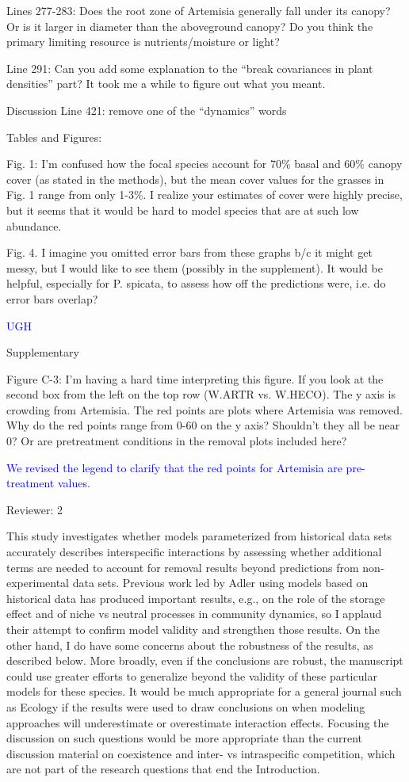 \documentclass[12pt]{article}
\newcommand{\response}{\textcolor{blue}}
\begin{document}
Lines 277-283: Does the root zone of Artemisia generally fall under its canopy? Or is it larger in diameter than the aboveground canopy? Do you think the primary limiting resource is nutrients/moisture or light?

Line 291: Can you add some explanation to the “break covariances in plant densities” part? It took me a while to figure out what you meant. 

Discussion
Line 421: remove one of the “dynamics” words 

Tables and Figures:

Fig. 1: I’m confused how the focal species account for 70\% basal and 60\% canopy cover (as stated in the methods), but the mean cover values for the grasses in Fig. 1 range from only 1-3\%. I realize your estimates of cover were highly precise, but it seems that it would be hard to model species that are at such low abundance.

Fig. 4. I imagine you omitted error bars from these graphs b/c it might get messy, but I would like to see them (possibly in the supplement). It would be helpful, especially for P. spicata, to assess how off the predictions were, i.e. do error bars overlap?

\response{UGH}

Supplementary

Figure C-3: I’m having a hard time interpreting this figure. If you look at the second box from the left on the top row (W.ARTR vs. W.HECO). The y axis is crowding from Artemisia. The red points are plots where Artemisia was removed. Why do the red points range from 0-60 on the y axis? Shouldn't they all be near 0? Or are pretreatment conditions in the removal plots included here? 

\response{We revised the legend to clarify that the red points for Artemisia are pre-treatment values.}

Reviewer: 2

This study investigates whether models parameterized from historical data sets accurately describes
interspecific interactions by assessing whether additional terms are needed to account for removal
results beyond predictions from non-experimental data sets. Previous work led by Adler using models
based on historical data has produced important results, e.g., on the role of the storage effect and of
niche vs neutral processes in community dynamics, so I applaud their attempt to confirm model validity
and strengthen those results. On the other hand, I do have some concerns about the robustness of the
results, as described below. More broadly, even if the conclusions are robust, the manuscript could use
greater efforts to generalize beyond the validity of these particular models for these species. It would
be much appropriate for a general journal such as Ecology if the results were used to draw conclusions
on when modeling approaches will underestimate or overestimate interaction effects. Focusing the
discussion on such questions would be more appropriate than the current discussion material on
coexistence and inter- vs intraspecific competition, which are not part of the research questions that
end the Introduction.
\end{document}
